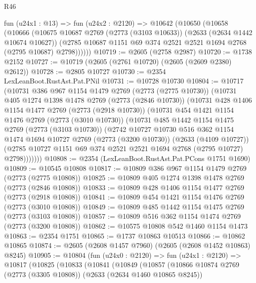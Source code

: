 \begin{lexlean}{R46}
\begin{coremodule}
    fun (u24x1 : @13) =>
    fun (u24x2 : @2120) =>
    @10642
      (@10650
        (@10658
          (@10666
            (@10675
              @10687
              @2769
              (@2773 (@3103 @10633))
              (@2633 (@2634 @1442 @10674 @10627))
              (@2785 @10687 @1151 @69 @374 @2521 @2521 @1694 @2768 (@2795 @10687) @2798))))))
@10719 := @2605 (@2758 @2987)
@10720 := @1738 @2152
@10727 := @10719 (@2605 (@2761 @10720) (@2605 (@2609 @2380) @2612))
@10728 := @2805 @10727
@10730 := @2354 LexLeanBoot.RustAst.Pat.PNil
@10731 := @10728 @10730
@10804 := @10717
    (@10731
      @386
      @967
      @1154
      @1479
      @2769
      (@2773 (@2775 @10730))
      (@10731
        @405
        @1274
        @1398
        @1478
        @2769
        (@2773 (@2846 @10730))
        (@10731
          @428
          @1406
          @1154
          @1477
          @2769
          (@2773 (@2918 @10730))
          (@10731
            @454
            @1421
            @1154
            @1476
            @2769
            (@2773 (@3010 @10730))
            (@10731
              @485
              @1442
              @1154
              @1475
              @2769
              (@2773 (@3103 @10730))
              (@2742
                @10727
                @10730
                @516
                @362
                @1154
                @1474
                @1694
                @10727
                @2769
                (@2773 (@3200 @10730))
                (@2633 (@4109 @10727))
                (@2785 @10727 @1151 @69 @374 @2521 @2521 @1694 @2768 (@2795 @10727) @2798)))))))
@10808 := @2354 (LexLeanBoot.RustAst.Pat.PCons @1751 @1690)
@10809 := @10545 @10808
@10817 := @10809 @386 @967 @1154 @1479 @2769 (@2773 (@2775 @10808))
@10825 := @10809 @405 @1274 @1398 @1478 @2769 (@2773 (@2846 @10808))
@10833 := @10809 @428 @1406 @1154 @1477 @2769 (@2773 (@2918 @10808))
@10841 := @10809 @454 @1421 @1154 @1476 @2769 (@2773 (@3010 @10808))
@10849 := @10809 @485 @1442 @1154 @1475 @2769 (@2773 (@3103 @10808))
@10857 := @10809 @516 @362 @1154 @1474 @2769 (@2773 (@3200 @10808))
@10862 := @10575 @10808 @542 @1460 @1154 @1473
@10863 := @2354 @1751
@10865 := @1737 @10863 @10513
@10866 := @10862 @10865
@10874 := @2605 (@2608 @1457 @7960) (@2605 (@2608 @1452 @10863) @8245)
@10905 := @10804
    (fun (u24x0 : @2120) =>
    fun (u24x1 : @2120) =>
    @10817
      (@10825
        (@10833
          (@10841
            (@10849
              (@10857
                (@10866
                  @10874
                  @2769
                  (@2773 (@3305 @10808))
                  (@2633 (@2634 @1460 @10865 @8245))

\end{coremodule}
\end{lexlean}
